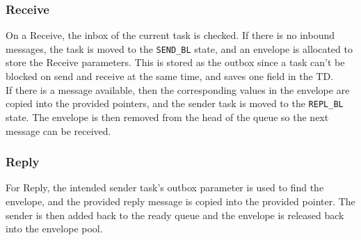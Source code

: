 \documentclass[12pt]{article}
\begin{document}
\subsubsection{Receive}
On a Receive, the inbox of the current task is checked. If there is no inbound messages, the task is moved to the \texttt{SEND\_BL} state, 
and an envelope is allocated to store the Receive parameters. This is stored as the outbox since a task can't be blocked
on send and receive at the same time, and saves one field in the TD.
\\
If there is a message available, then the corresponding values in the envelope are copied into the provided pointers, and the sender task is moved to the \texttt{REPL\_BL} state. The envelope is then removed from the head of the queue so the next message can be received.
\subsubsection{Reply}
For Reply, the intended sender task's outbox parameter is used to find the envelope, and the provided reply message is copied into the provided pointer. The sender is then added back to the ready queue and the envelope is released back into the envelope pool.
\end{document}
